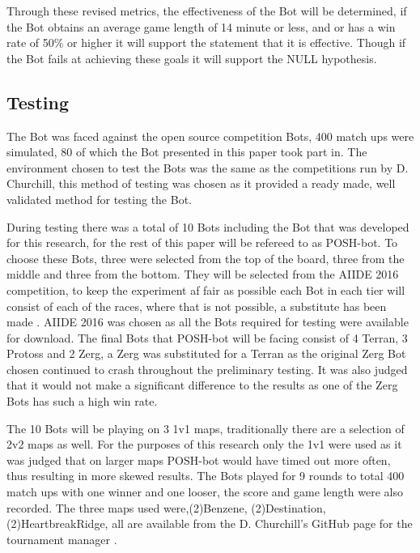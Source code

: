 \documentclass[journal]{IEEEtran}
\begin{document}
Through these revised metrics, the effectiveness of the Bot will be determined, if the Bot obtains an average game length of 14 minute or less, and or has a win rate of 50\% or higher it will support the statement that it is effective. Though if the Bot fails at achieving these goals it will support the NULL hypothesis.

\subsection{Testing}
The Bot was faced against the open source competition Bots, 400 match ups were simulated, 80 of which the Bot presented in this paper took part in. The environment chosen to test the Bots was the same as the competitions run by D. Churchill, this method of testing was chosen as it provided a ready made, well validated method for testing the Bot.

During testing there was a total of 10 Bots including the Bot that was developed for this research, for the rest of this paper will be refereed to as POSH-bot. To choose these Bots, three were selected from the top of the board, three from the middle and three from the bottom. They will be selected from the AIIDE 2016 competition, to keep the experiment af fair as possible each Bot in each tier will consist of each of the races, where that is not possible, a substitute has been made \cite{2016}. AIIDE 2016 was chosen as all the Bots required for testing were available for download. The final Bots that POSH-bot will be facing consist of 4 Terran, 3 Protoss and 2 Zerg, a Zerg was substituted for a Terran as the original Zerg Bot chosen continued to crash throughout the preliminary testing. It was also judged that it would not make a significant difference to the results as one of the Zerg Bots has such a high win rate.

The 10 Bots will be playing on 3 1v1 maps, traditionally there are a selection of 2v2 maps as well. For the purposes of this research only the 1v1 were used as it was judged that on larger maps POSH-bot would have timed out more often, thus resulting in more skewed results. The Bots played for 9 rounds to total 400 match ups with one winner and one looser, the score and game length were also recorded. The three maps used were,(2)Benzene, (2)Destination, (2)HeartbreakRidge, all are available from the D. Churchill's GitHub page for the tournament manager \cite{Tournament}. 
\end{document}

